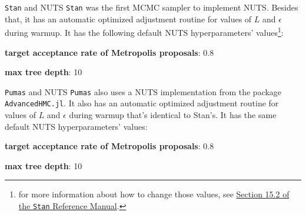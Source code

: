 \begin{frame}{\texttt{Stan} and NUTS}
	\texttt{Stan} was the first MCMC sampler to implement NUTS.
	Besides that, it has an automatic optimized adjustment routine for values of $L$ and $\epsilon$ during warmup.
	It has the following default NUTS hyperparameters' values\footnote{
		for more information about how to change those values, see \href{
			https://mc-stan.org/docs/reference-manual/hmc-algorithm-parameters.html}{
			Section 15.2 of the \texttt{Stan} Reference Manual}.}:
	\begin{vfilleditems}
		\item \textbf{target acceptance rate of Metropolis proposals}: 0.8
		\item \textbf{max tree depth}: 10
	\end{vfilleditems}
\end{frame}

\begin{frame}{\texttt{Pumas} and NUTS}
	\texttt{Pumas} also uses a NUTS implementation from the package \texttt{AdvancedHMC.jl}.
	It also has an automatic optimized adjustment routine for values of $L$ and $\epsilon$ during warmup that's identical to Stan's.
	It has the same default NUTS hyperparameters' values:
	\begin{vfilleditems}
		\item \textbf{target acceptance rate of Metropolis proposals}: 0.8
		\item \textbf{max tree depth}: 10
	\end{vfilleditems}
\end{frame}
